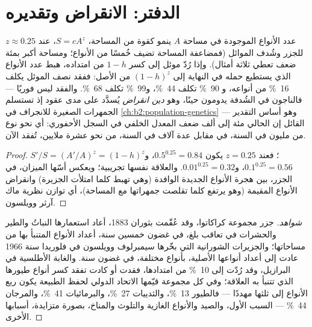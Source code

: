 \section{الدفتر: الانقراض وتقديره}

\begin{theorem}\label{thm:b2:global-change:sar}
عدد الأنواع الموجودة في مساحة $A$ ينمو كقوة من
المساحة، $S = cA^{z}$، عند $z \approx 0.25$ للجزر وشُدف
الموائل (فمضاعفة المساحة تضيف خُمسًا من الأنواع؛ ومساحة
أكبر بمئة ضعف تعطي ثلاثة أمثال). وإذا رُدّ موئل
إلى كسر $1 - h$ من امتداده، هبط عدد الأنواع
الذي يستطيع حمله في النهاية إلى $(1 - h)^{z}$ من الأصل: ففقد
نصف الموئل يكلف \qty{16}{\%} من أنواعه، و
\qty{90}{\%} تكلف \qty{44}{\%}، و\qty{99}{\%} تكلف
\qty{68}{\%}. والفقد ليس فوريًا --- فالناجون في
الشُدفة يدومون حينًا، وهو \emph{دين انقراض} يُسدَّد على مدى
عقود إذ تستسلم الجمهرات الصغيرة للانجراف  في
\cref{ch:b2:population-genetics} --- وهو أساس
التقدير القائل إن  الحالي مئة إلى
ألف ضعف المعدل الخلفي في السجل الأحفوري: أي نحو
نوع من مليون في السنة، في مقابل عدة آلاف في
السنة، من نحو عشرة ملايين، تُفقد الآن.
\end{theorem}
\begin{proof}
$S'/S = (A'/A)^{z} = (1 - h)^{z}$؛ فعند $z = 0.25$ يكون $0.5^{0.25} =
0.84$، و$0.1^{0.25} = 0.56$، و$0.01^{0.25} = 0.32$. والعلاقة
نفسها تجريبية؛ ويعكس أسّها الميزان، في الجزر،
بين هجرة الأنواع الجديدة الوافدة (وهي تهبط كلما امتلأت الجزيرة)
وانقراض الأنواع المقيمة (وهو يرتفع كلما تقلصت
جمهراتها مع المساحة)، أي توازن نظرية ماك آرثر
وويلسون.
\end{proof}
\begin{proof}[شواهد]
جزر مجموعة كراكاتوا، وقد عُقّمت بثوران
1883، أعاد استعمارها النباتُ والطير والحشرات في
تعاقب بلغ، في غضون خمسين سنة، أعداد الأنواع
المتنبأ بها من مساحاتها؛ والجزيرات الشورانية التي بخّرها سيمبرلوف
وويلسون في فلوريدا سنة 1966 عادت إلى أعداد أنواعها
الأصلية، بأنواع مختلفة، في غضون سنة. والغابة الأطلسية
في البرازيل، وقد رُدّت إلى \qty{10}{\%} من امتدادها، فقدت
أو كادت تفقد كسر أنواع طيورها الذي تتنبأ به العلاقة؛
وفي كل مجموعة قيّمها الاتحاد الدولي لحفظ
الطبيعة يكون ربع الأنواع إلى ثلثها مهددًا --- فالطيور
\qty{13}{\%}، والثدييات \qty{27}{\%}، والبرمائيات \qty{41}{\%}، والمرجان
\qty{44}{\%} ---  السبب الأول، والصيد
والأنواع الغازية والتلوث والمناخ، بصورة متزايدة، أسبابها الأخرى.
\end{proof}

